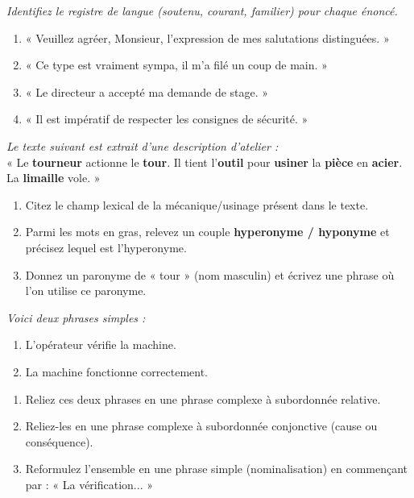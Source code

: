 \documentclass[11pt]{article}
\begin{document}
\begin{exercice}
\emph{Identifiez le registre de langue (soutenu, courant, familier) pour chaque énoncé.}
\begin{enumerate}
    \item « Veuillez agréer, Monsieur, l'expression de mes salutations distinguées. »
    \item « Ce type est vraiment sympa, il m'a filé un coup de main. »
    \item « Le directeur a accepté ma demande de stage. »
    \item « Il est impératif de respecter les consignes de sécurité. »
\end{enumerate}
\end{exercice}

\begin{exercice}
\emph{Le texte suivant est extrait d'une description d'atelier :} \\
« Le \textbf{tourneur} actionne le \textbf{tour}. Il tient l'\textbf{outil} pour \textbf{usiner} la \textbf{pièce} en \textbf{acier}. La \textbf{limaille} vole. »
\begin{enumerate}
    \item Citez le champ lexical de la mécanique/usinage présent dans le texte.
    \item Parmi les mots en gras, relevez un couple \textbf{hyperonyme / hyponyme} et précisez lequel est l'hyperonyme.
    \item Donnez un paronyme de « tour » (nom masculin) et écrivez une phrase où l'on utilise ce paronyme.
\end{enumerate}
\end{exercice}

\begin{exercice}
\emph{Voici deux phrases simples :}
\begin{enumerate}
    \item L'opérateur vérifie la machine.
    \item La machine fonctionne correctement.
\end{enumerate}
\begin{enumerate}
    \item Reliez ces deux phrases en une phrase complexe à subordonnée relative.
    \item Reliez-les en une phrase complexe à subordonnée conjonctive (cause ou conséquence).
    \item Reformulez l'ensemble en une phrase simple (nominalisation) en commençant par : « La vérification... »
\end{enumerate}
\end{exercice}
\end{document}
